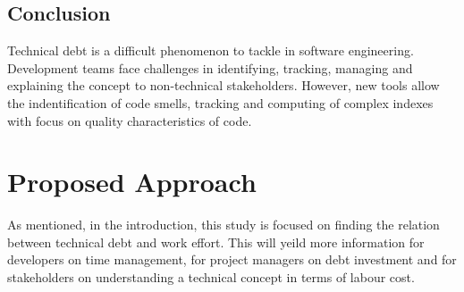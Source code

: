 \documentclass{mprop}
\begin{document}
\subsection{Conclusion}

Technical debt is a difficult phenomenon to tackle in software engineering.
Development teams face challenges in identifying, tracking, managing and
explaining the concept to non-technical stakeholders. However, new tools allow
the indentification of code smells, tracking and computing of complex indexes
with focus on quality characteristics of code.

\section{Proposed Approach}

As mentioned, in the introduction, this study is focused on finding the relation
between technical debt and work effort. This will yeild more information for
developers on time management, for project managers on debt investment and for
stakeholders on understanding a technical concept in terms of labour cost.
\end{document}
